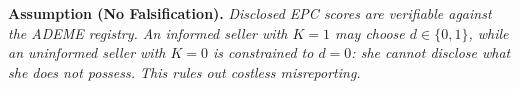 \noindent\textbf{Assumption (No Falsification).} \textit{Disclosed EPC scores are verifiable against the ADEME registry. An informed seller with $K=1$ may choose $d\in\{0,1\}$, while an uninformed seller with $K=0$ is constrained to $d=0$: she cannot disclose what she does not possess. This rules out costless misreporting.}
